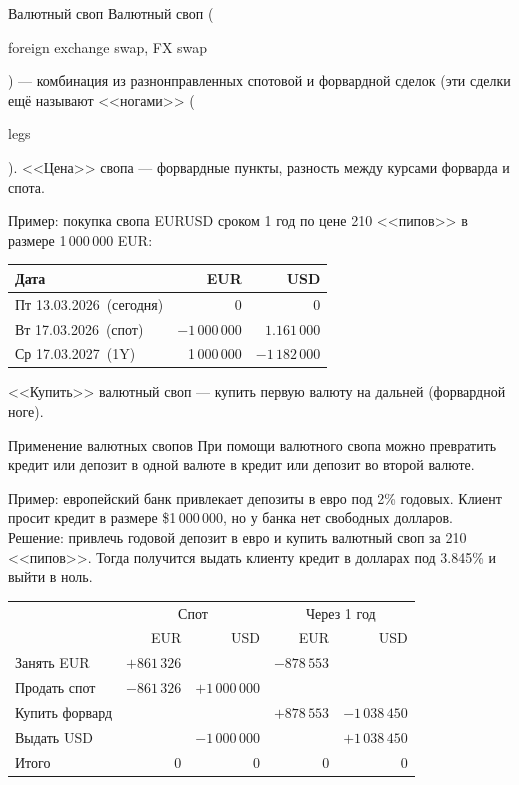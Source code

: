 \documentclass{beamer}
\newcommand{\en}[1]{\begin{otherlanguage}{english}#1\end{otherlanguage}}
\newcommand{\eurusdBigFigures}{1.16}
\newcommand{\eurusdBigFiguresPlusTwoPerMillion}{1\,18}
\newcommand{\eurusdBusinessDate}{Пт 13.03.2026}
\newcommand{\eurusdSpotDate}{Вт 17.03.2026}
\newcommand{\eurusdOneYearDate}{Ср 17.03.2027}
\begin{document}
\begin{frame}{Валютный своп}
\justify
\alert{Валютный своп} (\en{foreign exchange swap, FX swap}) --- комбинация из разнонправленных спотовой и форвардной сделок (эти сделки ещё называют <<ногами>> (\en{legs}).  <<Цена>> свопа --- форвардные пункты, разность между курсами форварда и спота. 

\justify
Пример: покупка свопа EURUSD сроком 1 год по цене 210 <<пипов>> в размере 1\,000\,000 EUR:

\centering
\begin{tabular}{l|r|r}
Дата                          & EUR & USD \\ \hline
\eurusdBusinessDate\ (сегодня)  & 0   & 0   \\
\eurusdSpotDate\ (спот) & $-1\,000\,000$ & $\eurusdBigFigures 1\,000$ \\
\eurusdOneYearDate\ (1Y)   & 1\,000\,000 & $-\eurusdBigFiguresPlusTwoPerMillion 2\,000$
\end{tabular}

\justify
<<Купить>> валютный своп --- купить первую валюту на дальней (форвардной ноге).
\end{frame}



\begin{frame}{Применение валютных свопов}
\justify
При помощи валютного свопа можно превратить кредит или депозит в одной валюте в кредит или депозит во второй валюте.

\justify
Пример: европейский банк привлекает депозиты в евро под 2\% годовых. Клиент просит кредит в размере \$1\,000\,000, но у банка нет свободных долларов. Решение: привлечь годовой депозит в евро и купить валютный своп за 210 <<пипов>>. Тогда получится выдать клиенту кредит в долларах под 3.845\% и выйти в ноль.

\centering
\small
\begin{tabular}{l|r|r|r|r}
& \multicolumn{2}{c|}{Спот} & \multicolumn{2}{c}{Через 1 год} \\ \cline{2-5}
& EUR & USD & EUR & USD \\ \hline
Занять EUR             & $+861\,326$ & & $-878\,553$ & \\
Продать спот            & $-861\,326$ & $+1\,000\,000$ & &   \\
Купить форвард    & & & $+878\,553$ & $-1\,038\,450$ \\
Выдать USD &                               &    $-1\,000\,000$                            & & $+1\,038\,450$ \\ \hline
Итого & 0 & 0 & 0 & 0
\end{tabular}
\end{frame}
\end{document}
